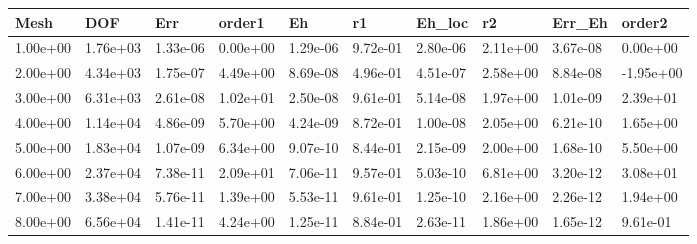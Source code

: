 \begin{tabular}{llllllllll}
Mesh & DOF & Err & order1 & Eh & r1 & Eh_loc & r2 & Err_Eh & order2 \\ 
\hline 
1.00e+00 & 1.76e+03 & 1.33e-06 & 0.00e+00 & 1.29e-06 & 9.72e-01 & 2.80e-06 & 2.11e+00 & 3.67e-08 &  0.00e+00 \\ 
2.00e+00 & 4.34e+03 & 1.75e-07 & 4.49e+00 & 8.69e-08 & 4.96e-01 & 4.51e-07 & 2.58e+00 & 8.84e-08 & -1.95e+00 \\ 
3.00e+00 & 6.31e+03 & 2.61e-08 & 1.02e+01 & 2.50e-08 & 9.61e-01 & 5.14e-08 & 1.97e+00 & 1.01e-09 &  2.39e+01 \\ 
4.00e+00 & 1.14e+04 & 4.86e-09 & 5.70e+00 & 4.24e-09 & 8.72e-01 & 1.00e-08 & 2.05e+00 & 6.21e-10 &  1.65e+00 \\ 
5.00e+00 & 1.83e+04 & 1.07e-09 & 6.34e+00 & 9.07e-10 & 8.44e-01 & 2.15e-09 & 2.00e+00 & 1.68e-10 &  5.50e+00 \\ 
6.00e+00 & 2.37e+04 & 7.38e-11 & 2.09e+01 & 7.06e-11 & 9.57e-01 & 5.03e-10 & 6.81e+00 & 3.20e-12 &  3.08e+01 \\ 
7.00e+00 & 3.38e+04 & 5.76e-11 & 1.39e+00 & 5.53e-11 & 9.61e-01 & 1.25e-10 & 2.16e+00 & 2.26e-12 &  1.94e+00 \\ 
8.00e+00 & 6.56e+04 & 1.41e-11 & 4.24e+00 & 1.25e-11 & 8.84e-01 & 2.63e-11 & 1.86e+00 & 1.65e-12 &  9.61e-01 \\ 
\hline 
\end{tabular}